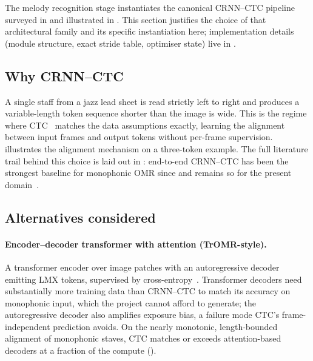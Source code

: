 The melody recognition stage instantiates the canonical CRNN--CTC
pipeline surveyed in  and illustrated in
.
This section justifies the choice of that architectural family and
its specific instantiation here; implementation details (module
structure, exact stride table, optimiser state) live in
.

\subsection{Why CRNN--CTC}

A single staff from a jazz lead sheet is read strictly left to right
and produces a variable-length token sequence shorter than the image
is wide. This is the regime where
CTC~\cite{gravesConnectionistTemporal2006} matches the data
assumptions exactly, learning the alignment between input frames and
output tokens without per-frame supervision.
 illustrates the alignment mechanism on a
three-token example.
The full literature trail behind this choice is laid out in
: end-to-end CRNN--CTC has been the strongest
baseline for monophonic OMR since
\textcite{calvoZaragozaEndToEndNeural2018} and remains so for the
present
domain~\cite{calvoZaragozaCameraPrimus2018,mayerPracticalEndToEnd2024}.



\subsection{Alternatives considered}
\label{sec:design-model-alts}

\paragraph{Encoder--decoder transformer with attention (TrOMR-style).}
A transformer encoder over image patches with an autoregressive
decoder emitting LMX tokens, supervised by
cross-entropy~\cite{riosVilaSheetMusicTransformer2024}.
Transformer decoders need substantially more training data than
CRNN--CTC to match its accuracy on monophonic input, which the project
cannot afford to generate; the autoregressive decoder also amplifies
exposure bias, a failure mode CTC's frame-independent prediction
avoids. On the nearly monotonic, length-bounded alignment of
monophonic staves, CTC matches or exceeds attention-based decoders at
a fraction of the compute ().

